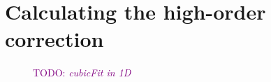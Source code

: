 \documentclass{article}
\newcommand{\TODO}[1]{\textcolor{purple}{TODO: \emph{#1}}}
\begin{document}
\section*{Calculating the high-order correction}


\begin{figure}
	\centering
	\caption{\TODO{cubicFit in 1D}}
	\label{fig:cubicFit}
\end{figure}



\end{document}

